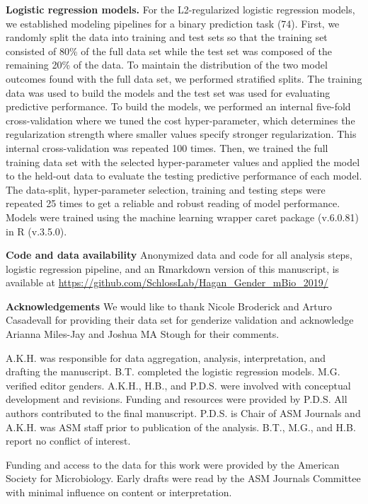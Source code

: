 \documentclass[11pt,]{article}
\begin{document}
\textbf{Logistic regression models.} For the L2-regularized logistic
regression models, we established modeling pipelines for a binary
prediction task (74). First, we randomly split the data into training
and test sets so that the training set consisted of 80\% of the full
data set while the test set was composed of the remaining 20\% of the
data. To maintain the distribution of the two model outcomes found with
the full data set, we performed stratified splits. The training data was
used to build the models and the test set was used for evaluating
predictive performance. To build the models, we performed an internal
five-fold cross-validation where we tuned the cost hyper-parameter,
which determines the regularization strength where smaller values
specify stronger regularization. This internal cross-validation was
repeated 100 times. Then, we trained the full training data set with the
selected hyper-parameter values and applied the model to the held-out
data to evaluate the testing predictive performance of each model. The
data-split, hyper-parameter selection, training and testing steps were
repeated 25 times to get a reliable and robust reading of model
performance. Models were trained using the machine learning wrapper
caret package (v.6.0.81) in R (v.3.5.0).

\textbf{Code and data availability} Anonymized data and code for all
analysis steps, logistic regression pipeline, and an Rmarkdown version
of this manuscript, is available at
\url{https://github.com/SchlossLab/Hagan_Gender_mBio_2019/}

\textbf{Acknowledgements} We would like to thank Nicole Broderick and
Arturo Casadevall for providing their data set for genderize validation
and acknowledge Arianna Miles-Jay and Joshua MA Stough for their
comments.

A.K.H. was responsible for data aggregation, analysis, interpretation,
and drafting the manuscript. B.T. completed the logistic regression
models. M.G. verified editor genders. A.K.H., H.B., and P.D.S. were
involved with conceptual development and revisions. Funding and
resources were provided by P.D.S. All authors contributed to the final
manuscript. P.D.S. is Chair of ASM Journals and A.K.H. was ASM staff
prior to publication of the analysis. B.T., M.G., and H.B. report no
conflict of interest.

Funding and access to the data for this work were provided by the
American Society for Microbiology. Early drafts were read by the ASM
Journals Committee with minimal influence on content or interpretation.
\end{document}
